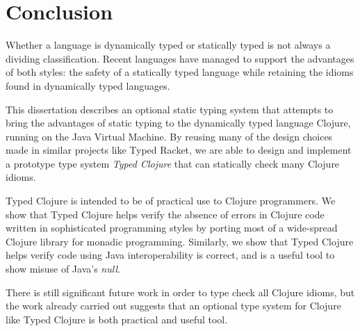 \documentclass{cshonours}
\begin{document}
\tableofcontents













\chapter{Conclusion}

Whether a language is dynamically typed or statically typed is not always a
dividing classification. Recent languages have managed to support the advantages of both styles:
the safety of a statically typed language while retaining the idioms found in
dynamically typed languages.

This dissertation describes an optional static typing system
that attempts to bring the advantages of static typing to the dynamically typed language
Clojure, running on the Java Virtual Machine. 
By reusing many of the design choices made in similar projects
like Typed Racket, we are able to design and implement a prototype type system
\emph{Typed Clojure} that can statically check many Clojure idioms.

Typed Clojure is intended to be of practical use to Clojure programmers.
We show that Typed Clojure helps verify the absence of errors in Clojure code written in sophisticated
programming styles by porting most of a wide-spread Clojure library for monadic programming.
Similarly, we show that Typed Clojure helps verify code using Java interoperability is correct, and is
a useful tool to show misuse of Java's \emph{null}.

There is still significant future work in order to type check all Clojure idioms,
but the work already carried out suggests that an optional type system for Clojure
like Typed Clojure is both practical and useful tool.

\printbibliography[title=References]


\end{document}
